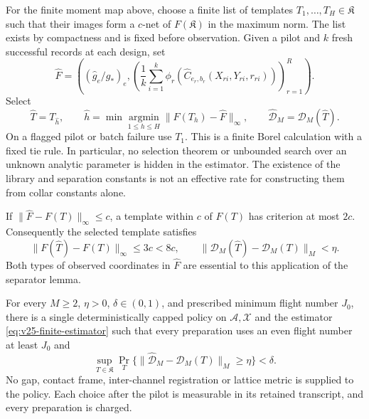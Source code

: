 For the finite moment map above, choose a finite list of templates
\(T_1,\ldots,T_H\in\mathfrak K\) such that their images form a
\(c\)-net of \(F(\mathfrak K)\) in the maximum norm.  The list exists by
compactness and is fixed before observation.  Given a pilot and \(k\)
fresh successful records at each design, set
\[
 \widehat F=\left((\widehat g_e/g_*)_e,
 \left(\frac1k\sum_{i=1}^k
 \phi_r(\widehat C_{e_r,b_r}(X_{ri},Y_{ri},r_{ri}))\right)_{r=1}^R\right).
\]
Select
\begin{equation}\label{eq:v25-finite-estimator}
 \widehat T=T_{\widehat h},\qquad
 \widehat h=\min\operatorname*{argmin}_{1\le h\le H}
                       \|F(T_h)-\widehat F\|_\infty,
 \qquad \widehat{\mathcal D}_M=\mathcal D_M(\widehat T).
\end{equation}
On a flagged pilot or batch failure use \(T_1\).  This is a finite Borel
calculation with a fixed tie rule.  In particular, no selection theorem or
unbounded search over an unknown analytic parameter is hidden in the
estimator.  The existence of the library and separation constants is not an
effective rate for constructing them from collar constants alone.

If \(\|\widehat F-F(T)\|_\infty\le c\), a template within \(c\) of
\(F(T)\) has criterion at most \(2c\).  Consequently the selected template
satisfies
\begin{equation}\label{eq:v25-deterministic-estimator-bound}
              \|F(\widehat T)-F(T)\|_\infty\le3c<8c,
 \qquad
              \|\mathcal D_M(\widehat T)-\mathcal D_M(T)\|_M<\eta.
\end{equation}
Both types of observed coordinates in \(\widehat F\) are essential to this
application of the separator lemma.

\begin{theorem}
\label{thm:v25-fixed-order-physical}
\label{thm:v24-fixed-M-physical-estimability}
For every \(M\ge2\), \(\eta>0\), \(\delta\in(0,1)\), and prescribed
minimum flight number \(J_0\), there is a single deterministically capped
policy on \(\mathscr A,\mathscr X\) and the estimator
\eqref{eq:v25-finite-estimator} such that every preparation uses an even
flight number at least \(J_0\) and
\begin{equation}\label{eq:v25-fixed-order-risk}
 \sup_{T\in\mathfrak K}
 \Pr_T\{\|\widehat{\mathcal D}_M-\mathcal D_M(T)\|_M\ge\eta\}<\delta.
\end{equation}
No gap, contact frame, inter-channel registration or lattice metric is
supplied to the policy.  Each choice after the pilot is measurable in its
retained transcript, and every preparation is charged.
\end{theorem}

